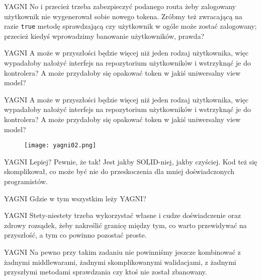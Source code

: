 \begin{frame}{YAGNI}		
	No i przecież trzeba zabezpieczyć podanego routa żeby zalogowany użytkownik nie wygenerował sobie nowego tokena. Zróbmy też zwracającą na razie \texttt{true} metodę sprawdzającą czy użytkownik w ogóle może zostać zalogowany; przecież kiedyś wprowadzimy banowanie użytkowników, prawda?
\end{frame}

\begin{frame}{YAGNI}		
	A może w przyszłości będzie więcej niż jeden rodzaj użytkownika, więc wypadałoby nałożyć interfejs na repozytorium użytkowników i wstrzyknąć je do kontrolera? A może przydałoby się opakować token w jakiś uniwersalny view model?
\end{frame}

\begin{frame}{YAGNI}		
	A może w przyszłości będzie więcej niż jeden rodzaj użytkownika, więc wypadałoby nałożyć interfejs na repozytorium użytkowników i wstrzyknąć je do kontrolera? A może przydałoby się opakować token w jakiś uniwersalny view model?
\end{frame}

\begin{frame}
	\begin{figure} \centering
		\texttt{[image: yagni02.png]}
	\end{figure}
\end{frame}

\begin{frame}{YAGNI}		
	Lepiej? Pewnie, że tak! Jest jakby SOLID-niej, jakby czyściej. Kod też się skomplikował, co może być nie do przeskoczenia dla mniej doświadczonych programistów.
\end{frame}

\begin{frame}{YAGNI}		
	Gdzie w tym wszystkim leży YAGNI?
\end{frame}

\begin{frame}{YAGNI}		
	Stety-niestety trzeba wykorzystać własne i cudze doświadczenie oraz zdrowy rozsądek, żeby nakreślić granicę między tym, co warto przewidywać na przyszłość, a tym co powinno pozostać proste.
\end{frame}

\begin{frame}{YAGNI}		
	Na pewno przy takim zadaniu nie powinniśmy jeszcze kombinować z żadnymi middlewarami, żadnymi skomplikowanymi walidacjami, z żadnymi przyszłymi metodami sprawdzania czy ktoś nie został zbanowany.
\end{frame}

